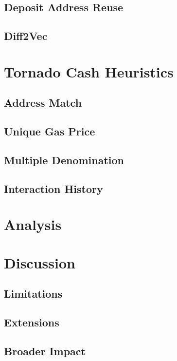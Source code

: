 \documentclass[11pt,a4paper]{article}
\begin{document}
\subsection{Deposit Address Reuse}

\subsection{Diff2Vec}

\section{Tornado Cash Heuristics}

\subsection{Address Match}

\subsection{Unique Gas Price}

\subsection{Multiple Denomination}

\subsection{Interaction History}

\section{Analysis}

\section{Discussion}

\subsection{Limitations}

\subsection{Extensions}

\subsection{Broader Impact}



\end{document}
